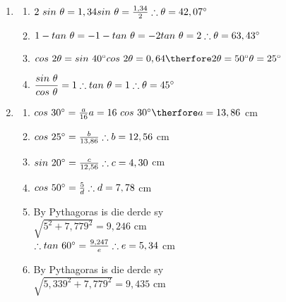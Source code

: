 \begin{eocsolutions}{}
{\begin{enumerate}[itemsep=6pt, label=\textbf{\arabic*}. ]
\item    
\begin{multicols}{2}
 \begin{enumerate}[itemsep=3pt, label=\textbf{(\alph*)} ]
     \item $2 ~sin~\theta= 1,34\\sin~\theta=\frac{1,34}{2}\\\therefore \theta=42,07^{\circ}$%
    \item $1-tan~\theta = -1\\ -tan~\theta = -2\\tan~\theta = 2\\ \therefore \theta=63,43^{\circ}$%
    \item $cos~2\theta = sin~40^{\circ}\\ cos~2\theta = 0,64\\ \therfore 2\theta = 50^{\circ}\\ \theta = 25^{\circ}$%
    \item $\dfrac{sin~\theta}{cos~\theta} = 1\\ \therefore tan~\theta = 1\\ \therefore \theta=45^{\circ}$%
    \end{enumerate}
\end{multicols}
\item 
\begin{multicols}{2}
    \begin{enumerate}[itemsep=3pt, label=\textbf{(\alph*)} ]
\item$cos~30^{\circ} =\frac{a}{16}\\ a = 16~cos~30^{\circ} \\ \therfore a=13,86$ cm
\item$cos~25^{\circ} =\frac{b}{13,86}\\\therefore b=12,56$ cm
\item$sin~20^{\circ} =\frac{c}{12,56}\\ \therefore c=4,30$ cm
\item$cos~50^{\circ} =\frac{5}{d} \\ \therefore d=7,78$ cm
\item By Pythagoras is die derde sy \\$\sqrt{5^2 + 7,779^2} = 9,246$ cm\\

$\therefore tan~60^{\circ} = \frac{9,247}{e}\\ \therefore e=5,34$ cm
\item By Pythagoras is die derde sy \\$\sqrt{5,339^2 + 7,779^2} = 9,435$ cm\\


\end{enumerate}
\end{multicols}
\end{enumerate}}
\end{eocsolutions}
